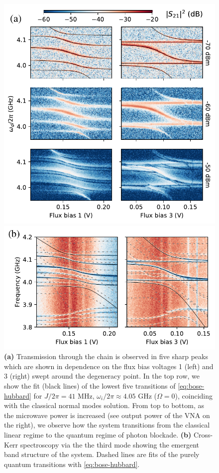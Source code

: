 \documentclass[%
 aps, pra,
 amsmath,amssymb,
 reprint,%
superscriptaddress
]{revtex4-2}
\begin{document}
\begin{figure}
	\centering
	\includegraphics[width=1\linewidth]{Pictures/fig2}
	
	\includegraphics[width=1\linewidth]{Pictures/cktt}
	\caption{\textbf{(a)} Transmission through the chain is observed in five sharp peaks which are shown in dependence on the flux bias voltages 1 (left) and 3 (right) swept around the degeneracy point. In the top row, we show the fit (black lines) of the lowest five transitions of \autoref{eq:bose-hubbard} for $J/2\pi = 41$ MHz, $\omega_i/2\pi \approx 4.05$ GHz ($\Omega = 0$), coinciding with the classical normal modes solution. From top to bottom, as the microwave power is increased (see output power of the VNA on the right), we observe how the system transitions from the classical linear regime to the quantum regime of photon blockade. \textbf{(b)} Cross-Kerr spectroscopy via the the third mode showing the emergent band structure of the system. Dashed lines are fits of the purely quantum transitions with \autoref{eq:bose-hubbard}.}
	\label{fig:transmission}
\end{figure}
\end{document}
